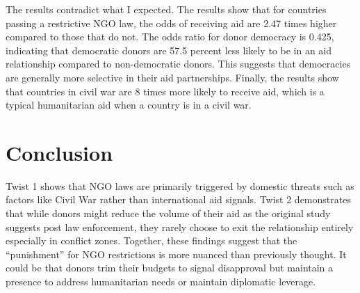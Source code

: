 \documentclass[12pt, a4paper]{article}
\begin{document}


The results contradict what I expected. The results show that for countries passing a restrictive NGO law, the odds of receiving aid are 2.47 times higher compared to those that do not. The odds ratio for donor democracy is 0.425, indicating that democratic donors are 57.5 percent less likely to be in an aid relationship compared to non-democratic donors. This suggests that democracies are generally more selective in their aid partnerships. Finally, the results show that countries in civil war are 8 times more likely to receive aid, which is a typical humanitarian aid when a country is in a civil war. 
\clearpage

\section{Conclusion}
Twist 1 shows that NGO laws are primarily triggered by domestic threats such as factors like Civil War rather than international aid signals. Twist 2 demonstrates that while donors might reduce the volume of their aid as the original study suggests post law enforcement, they rarely choose to exit the relationship entirely especially in conflict zones. Together, these findings suggest that the “punishment” for NGO restrictions is more nuanced than previously thought. It could be that donors trim their budgets to signal disapproval but maintain a presence to address humanitarian needs or maintain diplomatic leverage.
\end{document}

